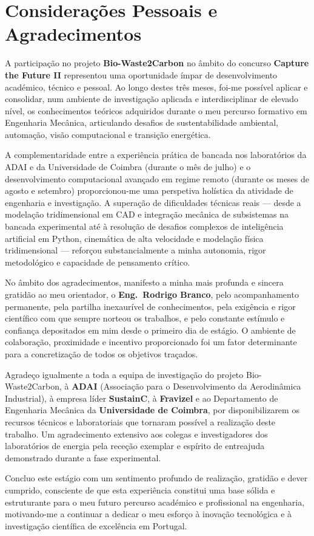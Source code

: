 \section{Considerações Pessoais e Agradecimentos}
\label{sec:consideracoes_pessoais}

A participação no projeto \textbf{Bio-Waste2Carbon} no âmbito do concurso \textbf{Capture the Future II} representou uma oportunidade ímpar de desenvolvimento académico, técnico e pessoal. Ao longo destes três meses, foi-me possível aplicar e consolidar, num ambiente de investigação aplicada e interdisciplinar de elevado nível, os conhecimentos teóricos adquiridos durante o meu percurso formativo em Engenharia Mecânica, articulando desafios de sustentabilidade ambiental, automação, visão computacional e transição energética.

A complementaridade entre a experiência prática de bancada nos laboratórios da ADAI e da Universidade de Coimbra (durante o mês de julho) e o desenvolvimento computacional avançado em regime remoto (durante os meses de agosto e setembro) proporcionou-me uma perspetiva holística da atividade de engenharia e investigação. A superação de dificuldades técnicas reais --- desde a modelação tridimensional em CAD e integração mecânica de subsistemas na bancada experimental até à resolução de desafios complexos de inteligência artificial em Python, cinemática de alta velocidade e modelação física tridimensional --- reforçou substancialmente a minha autonomia, rigor metodológico e capacidade de pensamento crítico.

No âmbito dos agradecimentos, manifesto a minha mais profunda e sincera gratidão ao meu orientador, o \textbf{Eng.~Rodrigo Branco}, pelo acompanhamento permanente, pela partilha inexaurível de conhecimentos, pela exigência e rigor científico com que sempre norteou os trabalhos, e pelo constante estímulo e confiança depositados em mim desde o primeiro dia de estágio. O ambiente de colaboração, proximidade e incentivo proporcionado foi um fator determinante para a concretização de todos os objetivos traçados.

Agradeço igualmente a toda a equipa de investigação do projeto Bio-Waste2Carbon, à \textbf{ADAI} (Associação para o Desenvolvimento da Aerodinâmica Industrial), à empresa líder \textbf{SustainC}, à \textbf{Fravizel} e ao Departamento de Engenharia Mecânica da \textbf{Universidade de Coimbra}, por disponibilizarem os recursos técnicos e laboratoriais que tornaram possível a realização deste trabalho. Um agradecimento extensivo aos colegas e investigadores dos laboratórios de energia pela receção exemplar e espírito de entreajuda demonstrado durante a fase experimental.

Concluo este estágio com um sentimento profundo de realização, gratidão e dever cumprido, consciente de que esta experiência constitui uma base sólida e estruturante para o meu futuro percurso académico e profissional na engenharia, motivando-me a continuar a dedicar o meu esforço à inovação tecnológica e à investigação científica de excelência em Portugal.
